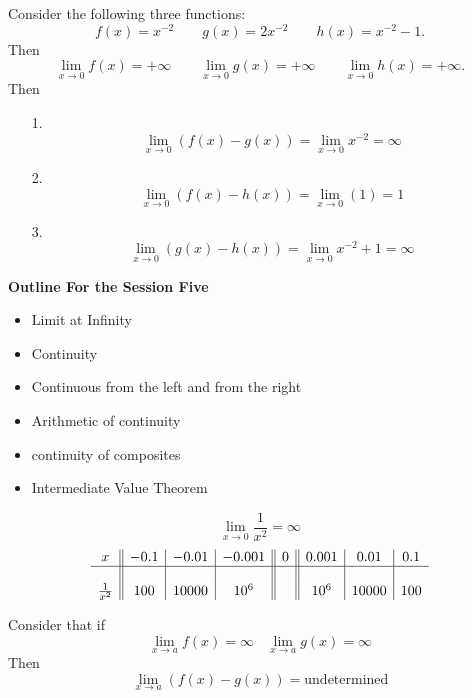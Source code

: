 \documentclass{beamer}
\begin{document}
\begin{frame}

\begin{Example}
	Consider the following three functions:
	$$f(x)=x^{-2}\quad \quad g(x)=2x^{-2}\quad \quad h(x)=x^{-2}-1.$$
	Then 
	$$\lim_{x\to 0}f(x)=+\infty \quad \quad \lim_{x\to 0}g(x)=+\infty \quad \quad \lim_{x\to 0}h(x)=+\infty.$$
	Then 
	\begin{itemize}
		\item[1.] $$ \lim_{x\to 0} (f(x)-g(x))=\lim_{x\to 0}x^{-2}=\infty$$
		\item[2.] $$ \lim_{x\to 0} (f(x)-h(x))=\lim_{x\to 0}(1)=1$$
		\item[3.] $$ \lim_{x\to 0} (g(x)-h(x))=\lim_{x\to 0}x^{-2}+1=\infty$$
	\end{itemize}
\end{Example}
\end{frame}


\begin{frame}{\bf Outline For the Session Five}
\begin{itemize}
	\item Limit at Infinity
	\item Continuity 
	\item Continuous from the left and from the right
	\item Arithmetic of continuity
	\item continuity of composites 
	\item Intermediate Value Theorem
\end{itemize}
\end{frame}

\begin{frame}
\begin{tcolorbox}[width=\textwidth,colback={green!10},title={},colbacktitle=yellow,coltitle=blue] 
\begin{example}
	$$ \lim_{x \to 0}\frac{1}{x^2} =\infty$$
$$	\begin{array}{c||c|c|c||c||c|c|c}
		x&-0.1&-0.01 & -0.001 & 0 & 0.001 & 0.01 & 0.1\\
		\hline
		&&&&&&&\\
	\frac{1}{x^2}	&100&10000&10^6& & 10^6 & 10000&100
	\end{array}
	$$
\end{example}
\end{tcolorbox}

Consider that if 
$$ \lim_{x\to a}f(x)=\infty~~~~  \lim_{x\to a}g(x)=\infty$$
Then  $$ \lim_{x\to a}(f(x)-g(x))=\text{undetermined}$$
\end{frame}
\end{document}
